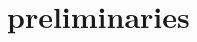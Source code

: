\documentclass[twocolumn,showpacs,preprintnumbers,amsmath,amssymb]{revtex4}
\begin{document}

\section{preliminaries}

%
%
%
\end{document}
